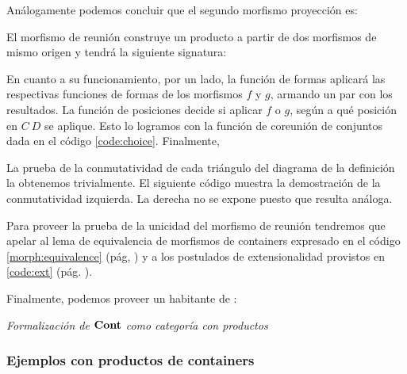 
Análogamente podemos concluir que el segundo morfismo proyección es:


El morfismo de reunión construye un producto a partir de dos morfismos de mismo origen y tendrá la siguiente signatura:
  

En cuanto a su funcionamiento, por un lado, la función de formas aplicará las respectivas funciones de formas de los morfismos $f$ y $g$, armando un par con los resultados. La función de posiciones decide si aplicar \mPos $f$ o \mPos $g$, según a qué posición en  $C\ D$ se aplique. Esto lo logramos con la función de coreunión de conjuntos \AgdaFunction{$[\_,\_]$} dada en el código \ref{code:choice}.
Finalmente,


La prueba de la conmutatividad de cada triángulo del diagrama de la definición la obtenemos trivialmente. El siguiente código muestra la demostración de la conmutatividad izquierda. La derecha no se expone puesto que resulta análoga.


Para proveer la prueba de la unicidad del morfismo de reunión tendremos que apelar al lema de equivalencia de morfismos de containers expresado en el código \ref{morph:equivalence} (pág, \pageref{morph:equivalence}) y a los postulados de extensionalidad provistos en \ref{code:ext} (pág. \pageref{code:ext}).


Finalmente, podemos proveer un habitante de  \AgdaFunction{$\Cont$}:

\begin{agdacode}{\it Formalización de $\Cont$ como categoría con productos} 
  
\end{agdacode}


\subsubsection{Ejemplos con productos de containers}

